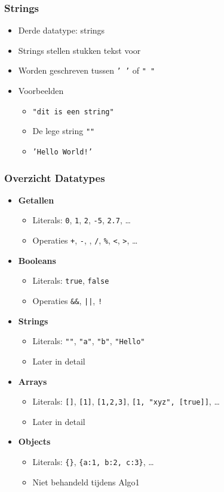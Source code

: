 \documentclass{../khlslides}
\begin{document}
\begin{frame}
  \frametitle{Strings}
  \begin{itemize}
    \item Derde datatype: strings
          \vskip2mm
    \item Strings stellen stukken tekst voor
          \vskip2mm
    \item Worden geschreven tussen {\tt ' '} of {\tt " "}
          \vskip2mm
    \item Voorbeelden
          \begin{itemize}
            \item {\tt "dit is een string"}
            \item De lege string {\tt ""}
            \item {\tt 'Hello World!'}
          \end{itemize}
  \end{itemize}
\end{frame}

\begin{frame}
  \frametitle{Overzicht Datatypes}
  \begin{itemize}
    \item {\bf Getallen}
          \begin{itemize}
            \item Literals: {\tt 0}, {\tt 1}, {\tt 2}, {\tt -5}, {\tt 2.7}, \dots
            \item Operaties {\tt +}, {\tt -}, {\tt *}, {\tt /}, {\tt \%}, {\tt <}, {\tt >}, \dots
          \end{itemize}
          \vskip2mm
    \item {\bf Booleans}
          \begin{itemize}
            \item Literals: {\tt true}, {\tt false}
            \item Operaties {\tt \&\&}, {\tt ||}, {\tt !}
          \end{itemize}
          \vskip2mm
    \item {\bf Strings}
          \begin{itemize}
            \item Literals: {\tt ""}, {\tt "a"}, {\tt "b"}, {\tt "Hello"}
            \item Later in detail
          \end{itemize}
          \vskip2mm
    \item {\bf Arrays}
          \begin{itemize}
            \item Literals: {\tt []}, {\tt [1]}, {\tt [1,2,3]}, {\tt [1, "xyz", [true]]}, \dots
            \item Later in detail
          \end{itemize}
          \vskip2mm
    \item {\bf Objects}
          \begin{itemize}
            \item Literals: {\tt \{\}}, {\tt \{a:1, b:2, c:3\}}, \dots
            \item Niet behandeld tijdens Algo1
          \end{itemize}
  \end{itemize}
\end{frame}
\end{document}
